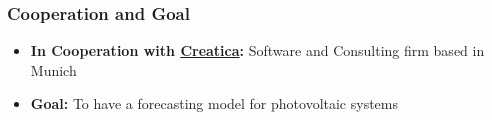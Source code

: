 \begin{frame}
    \frametitle{Cooperation and Goal}
    \begin{itemize}
        \item \textbf{In Cooperation with \href{https://www.creatica.de}{Creatica}:} Software and Consulting firm based in Munich
        \item \textbf{Goal:} To have a forecasting model for photovoltaic systems
    \end{itemize}
\end{frame}
